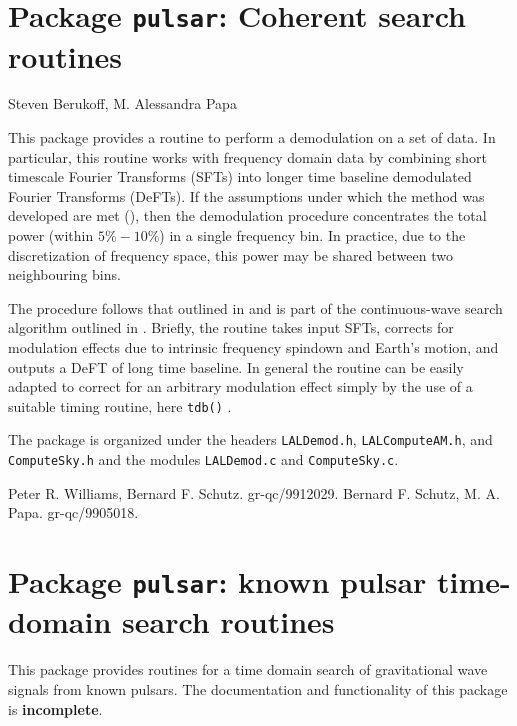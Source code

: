 \chapter{Package \texttt{pulsar}: Coherent search routines}
Steven Berukoff, M. Alessandra Papa
\bigskip

This package provides a routine to perform a demodulation on a set of data.
In particular, this routine works with frequency domain data by combining
short timescale Fourier Transforms (SFTs) into longer time baseline
demodulated Fourier Transforms (DeFTs). If the assumptions under which the
method was developed are met (\cite{Williams:1999}), then the demodulation
procedure concentrates the total power (within $5\%-10\%$) in a single
frequency bin. In practice, due to the discretization of frequency space, this
power may be shared between two neighbouring bins.

The procedure follows that outlined in \cite{Williams:1999} and is part of the
continuous-wave search algorithm outlined in \cite{Schutz:1999}.  Briefly, the
routine takes input SFTs, corrects for modulation effects due to intrinsic
frequency spindown and Earth's motion, and outputs a DeFT of long time
baseline. In general the routine can be easily adapted to correct for an
arbitrary modulation effect simply by the use of a suitable timing routine,
here \verb+tdb()+ .

The package is organized under the headers \verb+LALDemod.h+, \verb+LALComputeAM.h+, and
\verb+ComputeSky.h+ and the modules \verb+LALDemod.c+ and \verb+ComputeSky.c+.


\newpage
\newpage
\newpage
\newpage

\newpage\begin{thebibliography}{0}
        Peter R. Williams, Bernard F. Schutz.  gr-qc/9912029.
        Bernard F. Schutz, M. A. Papa.  gr-qc/9905018. 
\end{thebibliography}

\chapter{Package \texttt{pulsar}: known pulsar time-domain search routines}

This package provides routines for a time domain search of gravitational wave
signals from known pulsars.  The documentation and functionality of this
package is \textbf{incomplete}.
\newpage
\newpage
\newpage
